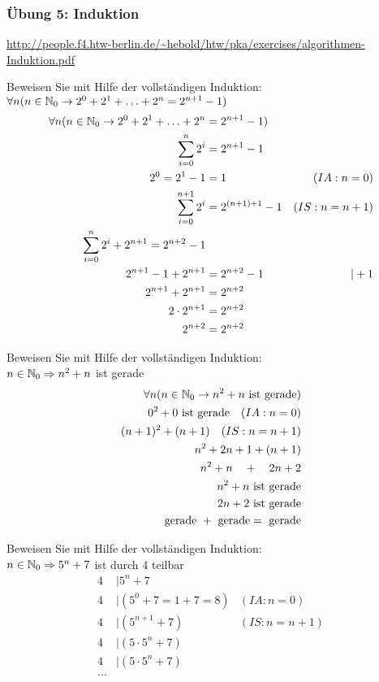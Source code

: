 \begin{card}
	\frametitle{Übung 5: Induktion}
	\url{http://people.f4.htw-berlin.de/~hebold/htw/pka/exercises/algorithmen-Induktion.pdf}
\end{card}

\begin{card}
  Beweisen Sie mit Hilfe der vollständigen Induktion:\\
  $\forall n (n \in \mathbb{N}_0 \rightarrow 2^0 + 2^1 + \ldots + 2^n = 2^{n+1} - 1)$
  \hr
  \begin{align*}
    \forall n (n \in \mathbb{N}_0 \rightarrow 2^0 + 2^1 + \ldots + 2^n &= 2^{n+1} - 1) \\
    \sum\limits_{i=0}^n 2^i &= 2^{n+1} - 1 \\
    2^0 = 2^1 - 1 &= 1 & (IA: n=0) \\
    \sum\limits_{i=0}^{n+1} 2^i &= 2^{(n+1)+1} - 1 & (IS: n=n+1) \\
    \sum\limits_{i=0}^{n} 2^i + 2^{n+1} = 2^{n+2} - 1 \\
    2^{n+1} - 1 + 2^{n+1} &= 2^{n+2} - 1 & |+1 \\
    2^{n+1} + 2^{n+1} &= 2^{n+2} \\
    2 \cdot 2^{n+1} &= 2^{n+2} \\
    2^{n+2} &= 2^{n+2}
  \end{align*}
\end{card}

\begin{card}
  Beweisen Sie mit Hilfe der vollständigen Induktion:\\
  $n \in \mathbb{N}_0 \Rightarrow n^2 + n$ ist gerade
  \hr
  \begin{align*}
    \forall n (n \in \mathbb{N}_0 \rightarrow n^2 + n \text{ ist gerade}) \\
    0^2 + 0 \text{ ist gerade} \quad (IA: n=0) \\
    (n+1)^2 + (n+1) \quad (IS: n=n+1) \\
    n^2 + 2n + 1 + (n+1) \\
    n^2 + n \quad + \quad 2n + 2 \\
    n^2 + n \text{ ist gerade} \\
    2n + 2 \text{ ist gerade} \\
    \text{gerade } + \text{ gerade} = \text{ gerade} \\
  \end{align*}
\end{card}

\begin{card}
  Beweisen Sie mit Hilfe der vollständigen Induktion:\\
  $n \in \mathbb{N}_0 \Rightarrow 5^n + 7$ ist durch 4 teilbar
  \hr
  \begin{align*}
    4 &\mid 5^n + 7 \\
    4 &\mid (5^0 + 7 = 1+7 = 8) & (IA: n=0) \\
    4 &\mid (5^{n+1} + 7) & (IS: n=n+1) \\
    4 &\mid (5 \cdot 5^n + 7) & \\
    4 &\mid (5 \cdot 5^n + 7) & \\
    ...
  \end{align*}
\end{card}

